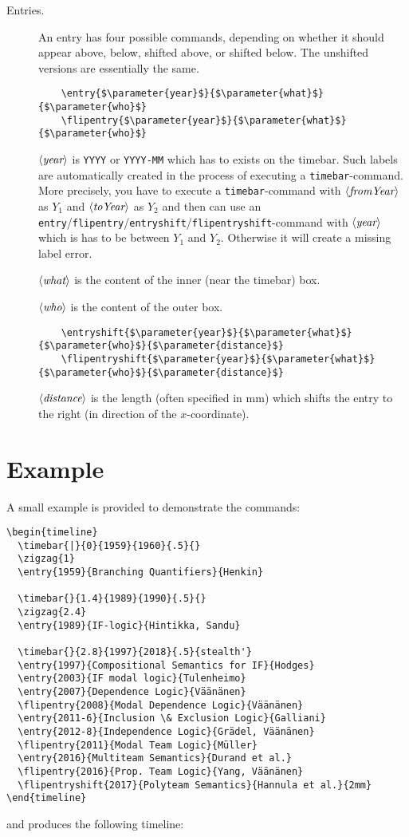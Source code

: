 \documentclass{article}
\newcommand{\parameter}[1]{\langle\normalfont\textit{#1}\rangle}
\begin{document}
\begin{description}
\item[Entries.] An entry has four possible commands, depending on whether it should appear above, below, shifted above, or shifted below. The unshifted versions are essentially the same.
\begin{lstlisting}
	\entry{$\parameter{year}$}{$\parameter{what}$}{$\parameter{who}$}
	\flipentry{$\parameter{year}$}{$\parameter{what}$}{$\parameter{who}$}
\end{lstlisting}
$\parameter{year}$ is \texttt{YYYY} or \texttt{YYYY-MM} which has to exists on the timebar. 
Such labels are automatically created in the process of executing a \texttt{timebar}-command. 
More precisely, you have to execute a \texttt{timebar}-command with $\parameter{fromYear}$ as $Y_1$ and $\parameter{toYear}$ as $Y_2$ and then can use an \texttt{entry}/\texttt{flipentry}/\texttt{entryshift}/\texttt{flipentryshift}-command with $\parameter{year}$ which is has to be between $Y_1$ and $Y_2$.
Otherwise it will create a missing label error.

$\parameter{what}$ is the content of the inner (near the timebar) box.

$\parameter{who}$ is the content of the outer box.

\begin{lstlisting}
	\entryshift{$\parameter{year}$}{$\parameter{what}$}{$\parameter{who}$}{$\parameter{distance}$}
	\flipentryshift{$\parameter{year}$}{$\parameter{what}$}{$\parameter{who}$}{$\parameter{distance}$}
\end{lstlisting}

$\parameter{distance}$ is the length (often specified in mm) which shifts the entry to the right (in direction of the $x$-coordinate).
\end{description}

\section{Example}
A small example is provided to demonstrate the commands:

\begin{lstlisting}
\begin{timeline}
  \timebar{|}{0}{1959}{1960}{.5}{}
  \zigzag{1}
  \entry{1959}{Branching Quantifiers}{Henkin}
  
  \timebar{}{1.4}{1989}{1990}{.5}{}
  \zigzag{2.4}
  \entry{1989}{IF-logic}{Hintikka, Sandu}
  
  \timebar{}{2.8}{1997}{2018}{.5}{stealth'}
  \entry{1997}{Compositional Semantics for IF}{Hodges}
  \entry{2003}{IF modal logic}{Tulenheimo}
  \entry{2007}{Dependence Logic}{Väänänen}
  \flipentry{2008}{Modal Dependence Logic}{Väänänen}
  \entry{2011-6}{Inclusion \& Exclusion Logic}{Galliani}
  \entry{2012-8}{Independence Logic}{Grädel, Väänänen}
  \flipentry{2011}{Modal Team Logic}{Müller}
  \entry{2016}{Multiteam Semantics}{Durand et al.}
  \flipentry{2016}{Prop. Team Logic}{Yang, Väänänen}
  \flipentryshift{2017}{Polyteam Semantics}{Hannula et al.}{2mm}
\end{timeline}
\end{lstlisting}
and produces the following timeline:
\end{document}

